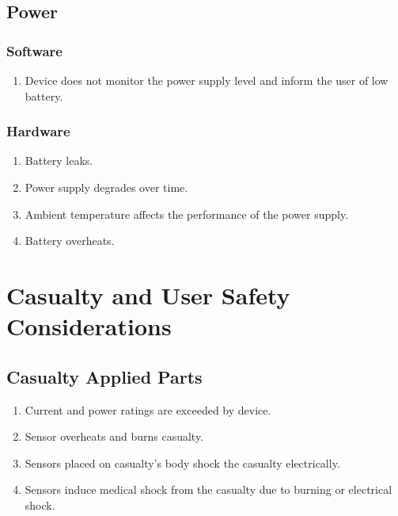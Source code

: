 \documentclass{article}
\begin{document}
    \subsection{Power}
        \subsubsection{Software}
            \begin{enumerate}[label = (\alph*)]
                \item  Device does not monitor the power supply level and inform the user of low battery.
            \end{enumerate}
        \subsubsection{Hardware}
            \begin{enumerate}[label = (\alph*)]
                \item  Battery leaks.   
                \item  Power supply degrades over time.
                \item  Ambient temperature affects the performance of the power supply.
                \item  Battery overheats.
            \end{enumerate}
    
    
    
    \section{Casualty and User Safety Considerations}
      
    \subsection{Casualty Applied Parts}
        \begin{enumerate}[label = (\alph*)]
            \item Current and power ratings are exceeded by device.
            \item Sensor overheats and burns casualty.
            \item Sensors placed on casualty's body shock the casualty electrically.
            \item Sensors induce medical shock from the casualty due to burning or electrical shock.
        \end{enumerate}
   
\end{document}
